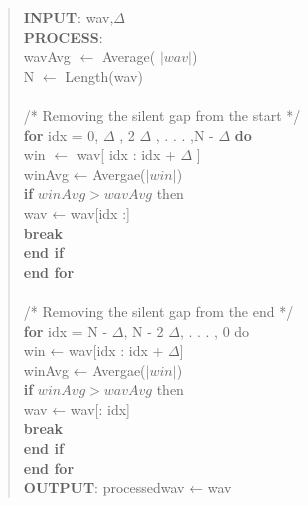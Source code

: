 \begin{enumerate}
\begin{quote}
\textbf{INPUT}: wav,$\Delta$
\\
\textbf{PROCESS}:
\\
wavAvg $\gets$ Average( $\left| wav \right|$)
\\
N $\gets$ Length(wav)
\\
\\
/* Removing the silent gap from the start */
\\
\textbf{for} idx = 0, $\Delta$ , 2 $\Delta$ , . . . ,N - $\Delta$ \textbf{do}
\\
\hspace*{1cm} win $\gets$  wav[ idx : idx + $\Delta$  ]
\\
\hspace*{1cm} winAvg ← Avergae($\left| win \right|$)
\\
\hspace*{1cm} \textbf{if} $winAvg > wavAvg$ then
\\
\hspace*{2cm}wav ← wav[idx :]
\\
 \hspace*{2cm}\textbf{break}
 \\
 \hspace*{1cm} \textbf{end if}
 \\
 \textbf{end for}
 \\
 \\
 /* Removing the silent gap from the end */
 \\
\textbf{for} idx = N - $\Delta$, N - 2 $\Delta$, . . . , 0 do
\\
\hspace*{1cm} win ← wav[idx : idx + $\Delta$]
\\
\hspace*{1cm} winAvg ← Avergae($\left| win \right|$)
\\
\hspace*{1cm} \textbf{if} $winAvg > wavAvg$ then
\\
\hspace*{2cm} wav ← wav[: idx]
\\
\hspace*{2cm} \textbf{break}
\\
\hspace*{1cm} \textbf{end if}
\\
\textbf{end for}
\\
\textbf{OUTPUT}: processed\textunderscore wav ← wav
\end{quote}






\end{enumerate}
